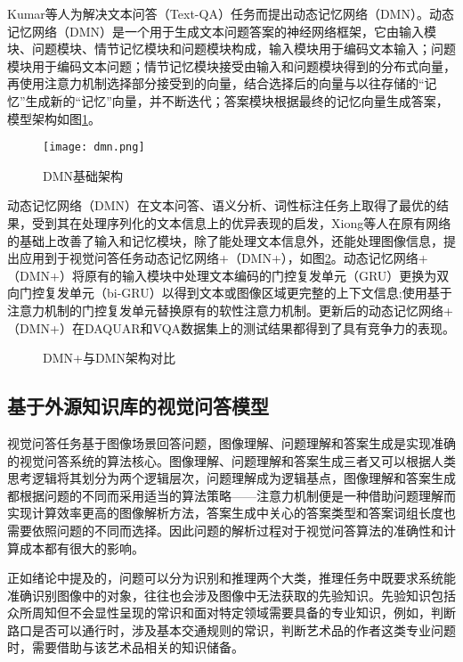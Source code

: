 Kumar等人为解决文本问答（Text-QA）任务而提出动态记忆网络（DMN）。动态记忆网络（DMN）是一个用于生成文本问题答案的神经网络框架，它由输入模块、问题模块、情节记忆模块和问题模块构成，输入模块用于编码文本输入；问题模块用于编码文本问题；情节记忆模块接受由输入和问题模块得到的分布式向量，再使用注意力机制选择部分接受到的向量，结合选择后的向量与以往存储的“记忆”生成新的“记忆”向量，并不断迭代；答案模块根据最终的记忆向量生成答案，模型架构如图\ref{dmn}。
\begin{figure}[H]
	\centering
	\texttt{[image: dmn.png]}
	\caption{DMN基础架构}
	\label{dmn}
\end{figure}

动态记忆网络（DMN）在文本问答、语义分析、词性标注任务上取得了最优的结果，受到其在处理序列化的文本信息上的优异表现的启发，Xiong等人在原有网络的基础上改善了输入和记忆模块，除了能处理文本信息外，还能处理图像信息，提出应用到于视觉问答任务动态记忆网络+（DMN+），如图\ref{v-dmn}。动态记忆网络+（DMN+）将原有的输入模块中处理文本编码的门控复发单元（GRU）更换为双向门控复发单元（bi-GRU）以得到文本或图像区域更完整的上下文信息;使用基于注意力机制的门控复发单元替换原有的软性注意力机制。更新后的动态记忆网络+（DMN+）在DAQUAR和VQA数据集上的测试结果都得到了具有竞争力的表现。
\begin{figure}[H]
	\centering
	\caption{DMN+与DMN架构对比}
	\label{v-dmn}
\end{figure}

\subsection{基于外源知识库的视觉问答模型}
视觉问答任务基于图像场景回答问题，图像理解、问题理解和答案生成是实现准确的视觉问答系统的算法核心。图像理解、问题理解和答案生成三者又可以根据人类思考逻辑将其划分为两个逻辑层次，问题理解成为逻辑基点，图像理解和答案生成都根据问题的不同而采用适当的算法策略——注意力机制便是一种借助问题理解而实现计算效率更高的图像解析方法，答案生成中关心的答案类型和答案词组长度也需要依照问题的不同而选择。因此问题的解析过程对于视觉问答算法的准确性和计算成本都有很大的影响。

正如绪论中提及的，问题可以分为识别和推理两个大类，推理任务中既要求系统能准确识别图像中的对象，往往也会涉及图像中无法获取的先验知识。先验知识包括众所周知但不会显性呈现的常识和面对特定领域需要具备的专业知识，例如，判断路口是否可以通行时，涉及基本交通规则的常识，判断艺术品的作者这类专业问题时，需要借助与该艺术品相关的知识储备。

